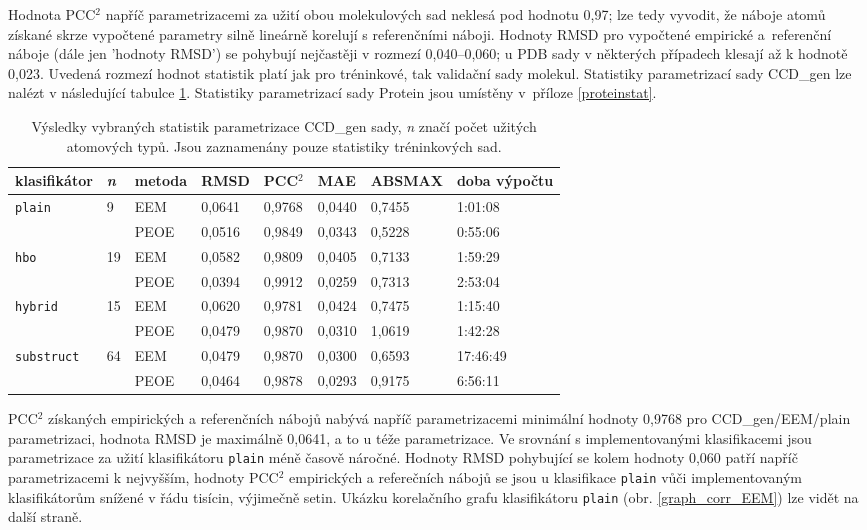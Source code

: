 Hodnota PCC$^2$ napříč parametrizacemi za užití obou molekulových sad neklesá pod hodnotu 0,97; lze tedy vyvodit, že náboje atomů získané skrze vypočtené parametry silně lineárně korelují s referenčními náboji. Hodnoty RMSD  pro vypočtené empirické a~referenční náboje (dále jen 'hodnoty RMSD') se pohybují nejčastěji v rozmezí 0,040–0,060; u PDB sady v některých případech klesají až k hodnotě 0,023. Uvedená rozmezí hodnot statistik platí jak pro tréninkové, tak validační sady molekul. Statistiky parametrizací sady CCD\_gen lze nalézt v následující tabulce \ref{statistics}. Statistiky parametrizací sady Protein jsou umístěny v~příloze \ref{proteinstat}. 
\medskip
\begin{table}[h]
    \small
    \renewcommand{\arraystretch}{1.4}
    \centering
    \begin{tabular}{l|l|l|l|l|l|l|l}
         \textbf{klasifikátor} & \textbf{\textit{n}} & \textbf{metoda} & \textbf{RMSD} & \textbf{PCC$^2$} & \textbf{MAE} & \textbf{ABSMAX} & \textbf{doba výpočtu}\\
         \hline
         \multirow{2}{6em}{\texttt{plain}} & \multirow{2}{1.5em}{ 9} & EEM & 0,0641 & 0,9768 & 0,0440 & 0,7455 & 1:01:08 \\
         & & PEOE & 0,0516 & 0,9849 & 0,0343 & 0,5228 & 0:55:06 \\
         \hline
         \multirow{2}{6em}{\texttt{hbo}} & \multirow{2}{1.5em}{19} & EEM & 0,0582 & 0,9809 & 0,0405 & 0,7133 & 1:59:29  \\
         & & PEOE & 0,0394 & 0,9912 & 0,0259 & 0,7313 & 2:53:04 \\
         \hline
         \multirow{2}{6em}{\texttt{hybrid}} & \multirow{2}{1.5em}{15} & EEM & 0,0620 & 0,9781 & 0,0424 & 0,7475 & 1:15:40 \\
         & & PEOE & 0,0479 & 0,9870 & 0,0310 & 1,0619 & 1:42:28 \\
         \hline
         \multirow{2}{6em}{\texttt{substruct}} & \multirow{2}{1.5em}{64} & EEM & 0,0479 & 0,9870 & 0,0300 & 0,6593 & 17:46:49 \\
         & & PEOE & 0,0464 & 0,9878 & 0,0293 & 0,9175 & 6:56:11 
    \end{tabular}
    \caption{Výsledky vybraných statistik parametrizace CCD\_gen sady, \textit{n} značí počet užitých atomových typů. Jsou zaznamenány pouze statistiky tréninkových sad.}
    \label{statistics}
\end{table}
\medskip
 
PCC$^2$ získaných empirických a referenčních nábojů nabývá napříč parametrizacemi minimální hodnoty 0,9768 pro CCD\_gen/EEM/plain parametrizaci, hodnota RMSD je maximálně 0,0641, a to u téže parametrizace. Ve srovnání s implementovanými klasifikacemi jsou parametrizace za užití klasifikátoru \verb|plain| méně časově náročné. Hodnoty RMSD pohybující se kolem hodnoty 0,060 patří napříč parametrizacemi k nejvyšším, hodnoty PCC$^2$ empirických a referečních nábojů se jsou u klasifikace \verb|plain| vůči implementovaným klasifikátorům snížené v řádu tisícin, výjimečně setin. Ukázku korelačního grafu klasifikátoru \verb|plain| (obr. \ref{graph_corr_EEM}) lze vidět na další straně.

